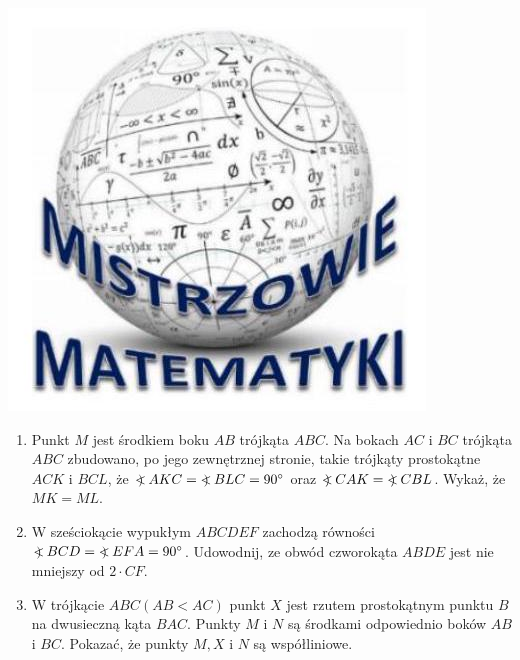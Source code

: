 \documentclass[10pt]{article}
\newcommand\Varangle{\mathop{{<\!\!\!\!\!\text{\small)}}\:}\nolimits}
\begin{document}
\begin{center}
\includegraphics[max width=\textwidth]{2024_11_21_d42001cef155bb036c77g-1}
\end{center}

\begin{enumerate}
  \item Punkt \(M\) jest środkiem boku \(A B\) trójkąta \(A B C\). Na bokach \(A C\) i \(B C\) trójkąta \(A B C\) zbudowano, po jego zewnętrznej stronie, takie trójkąty prostokątne \(A C K\) i \(B C L\), że \(\Varangle A K C=\Varangle B L C=90^{\circ}\) oraz \(\Varangle C A K=\Varangle C B L\). Wykaż, że \(M K=M L\).
  \item W sześciokącie wypukłym \(A B C D E F\) zachodzą równości \(\Varangle B C D=\Varangle E F A=90^{\circ}\). Udowodnij, ze obwód czworokąta \(A B D E\) jest nie mniejszy od \(2 \cdot C F\).
  \item W trójkącie \(A B C(A B<A C)\) punkt \(X\) jest rzutem prostokątnym punktu \(B\) na dwusieczną kąta \(B A C\). Punkty \(M\) i \(N\) są środkami odpowiednio boków \(A B\) i \(B C\). Pokazać, że punkty \(M, X\) i \(N\) są współliniowe.
\end{enumerate}
\end{document}
